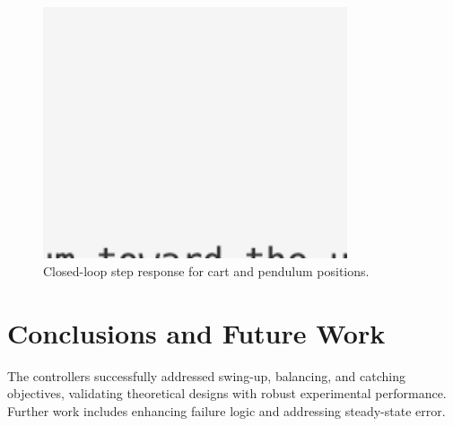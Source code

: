 \documentclass[12pt]{article}
\begin{document}
\begin{figure}[H]
    \centering
    \includegraphics[width=0.8\textwidth]{figures/ph.png}
    \caption{Closed-loop step response for cart and pendulum positions.}
    \label{fig:step_response}
\end{figure}

\section{Conclusions and Future Work}
The controllers successfully addressed swing-up, balancing, and catching objectives, validating theoretical designs with robust experimental performance. Further work includes enhancing failure logic and addressing steady-state error.



\end{document}
